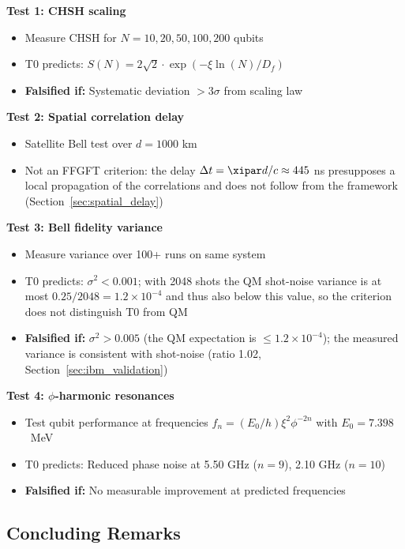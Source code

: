 \begin{experimentbox}
	\textbf{Test 1: CHSH scaling}
	\begin{itemize}
		\item Measure CHSH for $N = 10, 20, 50, 100, 200$ qubits
		\item T0 predicts: $S(N) = 2\sqrt{2} \cdot \exp(-\xi \ln(N)/D_f)$
		\item \textbf{Falsified if:} Systematic deviation $> 3\sigma$ from scaling law
	\end{itemize}
	
	\textbf{Test 2: Spatial correlation delay}
	\begin{itemize}
		\item Satellite Bell test over $d = 1000$ km
		\item Not an FFGFT criterion: the delay $\Delta t = \xipar d/c \approx 445$ ns presupposes a local propagation of the correlations and does not follow from the framework (Section~\ref{sec:spatial_delay})
	\end{itemize}

	
	\textbf{Test 3: Bell fidelity variance}
	\begin{itemize}
		\item Measure variance over 100+ runs on same system
		\item T0 predicts: $\sigma^2 < 0.001$; with 2048 shots the QM shot-noise variance is at most $0.25/2048 = 1.2 \times 10^{-4}$ and thus also below this value, so the criterion does not distinguish T0 from QM
		\item \textbf{Falsified if:} $\sigma^2 > 0.005$ (the QM expectation is $\leq 1.2 \times 10^{-4}$); the measured variance is consistent with shot-noise (ratio 1.02, Section~\ref{sec:ibm_validation})
	\end{itemize}
	
	\textbf{Test 4: $\phi$-harmonic resonances}
	\begin{itemize}
		\item Test qubit performance at frequencies $f_n = (E_0/h) \xi^2 \phi^{-2n}$ with $E_0 = 7.398$~MeV
		\item T0 predicts: Reduced phase noise at 5.50 GHz ($n = 9$), 2.10 GHz ($n = 10$)
		\item \textbf{Falsified if:} No measurable improvement at predicted frequencies
	\end{itemize}
\end{experimentbox}

\subsection{Concluding Remarks}

